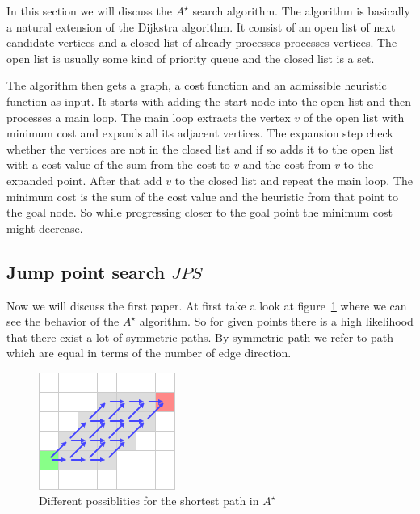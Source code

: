 \documentclass{article}
\begin{document}
    In this section we will discuss the $A^\star$ search algorithm. \cite{Astar} The algorithm is basically a natural extension of the Dijkstra algorithm. It consist of an open list of next candidate vertices and a closed list of already processes processes vertices. The open list is usually some kind of priority queue and the closed list is a set.
    
    The algorithm then gets a graph, a cost function and an admissible heuristic function as input. It starts with adding the start node into the open list and then processes a main loop. The main loop extracts the vertex $v$ of the open list with minimum cost and expands all its adjacent vertices. The expansion step check whether the vertices are not in the closed list and if so adds it to the open list with a cost value of the sum from the cost to $v$ and the cost from $v$ to the expanded point. After that add $v$ to the closed list and repeat the main loop. The minimum cost is the sum of the cost value and the heuristic from that point to the goal node. So while progressing closer to the goal point the minimum cost might decrease.
    
    \subsection{Jump point search $JPS$}
    
    Now we will discuss the first paper. \cite{DBLP:conf/aaai/HaraborG11} At first take a look at figure~\ref{fig:symmetricpath} where we can see the behavior of the $A^\star$ algorithm. So for given points there is a high likelihood that there exist a lot of symmetric paths. By symmetric path we refer to path which are equal in terms of the number of edge direction.
    
    \begin{figure}[!htb]
        \centering
        \includegraphics{figures/symmetricpath.png}
        \caption{Different possiblities for the shortest path in $A^\star$ \cite{JPSexplained}}
        \label{fig:symmetricpath}
    \end{figure}
    
\end{document}
